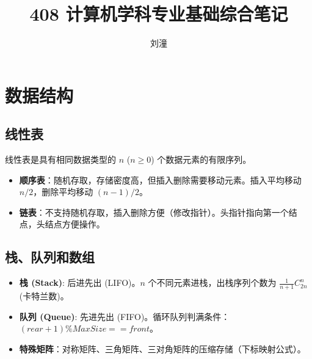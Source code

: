 \documentclass[cn,hazy,blue,12pt,screen,normal]{elegantnote}
\title{408 计算机学科专业基础综合笔记}
\author{刘潼}
\date{\zhtoday}
\begin{document}
\maketitle



\section{数据结构}

\subsection{线性表}
\begin{definition}[线性表]
线性表是具有相同数据类型的 $n$ ($n \geq 0$) 个数据元素的有限序列。
\end{definition}
\begin{note}
\begin{itemize}
    \item \textbf{顺序表}：随机存取，存储密度高，但插入删除需要移动元素。插入平均移动 $n/2$，删除平均移动 $(n-1)/2$。
    \item \textbf{链表}：不支持随机存取，插入删除方便（修改指针）。头指针指向第一个结点，头结点方便操作。
\end{itemize}
\end{note}

\subsection{栈、队列和数组}
\begin{itemize}
    \item \textbf{栈 (Stack)}: 后进先出 (LIFO)。$n$ 个不同元素进栈，出栈序列个数为 $\frac{1}{n+1}C_{2n}^n$ (卡特兰数)。
    \item \textbf{队列 (Queue)}: 先进先出 (FIFO)。循环队列判满条件：$(rear + 1) \% MaxSize == front$。
    \item \textbf{特殊矩阵}：对称矩阵、三角矩阵、三对角矩阵的压缩存储（下标映射公式）。
\end{itemize}
\end{document}
